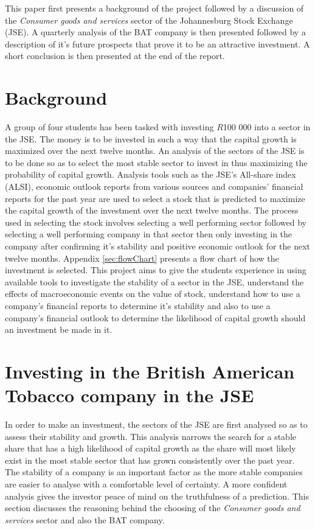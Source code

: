 \documentclass[letterpaper, 10 pt, conference]{ieeeconf}  %
\begin{document}
This paper first presents a background of the project followed by a discussion of the \textit{Consumer goods and services} sector of the Johannesburg Stock Exchange (JSE). A quarterly analysis of the BAT company is then presented followed by a description of it's future prospects that prove it to be an attractive investment. A short conclusion is then presented at the end of the report. 

\section{Background}

A group of four students has been tasked with investing $R$100 000 into a sector in the JSE. The money is to be invested in such a way that the capital growth is maximized over the next twelve months. An analysis of the sectors of the JSE is to be done so as to select the most stable sector to invest in thus maximizing the probability of capital growth. Analysis tools such as the JSE's All-share index (ALSI), economic outlook reports from various sources and companies' financial reports for the past year are used to select a stock that is predicted to maximize the capital growth of the investment over the next twelve months. The process used in selecting the stock involves selecting a well performing sector followed by selecting a well performing company in that sector then only investing in the company after confirming it's stability and positive economic outlook for the next twelve months. Appendix \ref{sec:flowChart} presents a flow chart of how the investment is selected. This project aims to give the students experience in using available tools to investigate the stability of a sector in the JSE, understand the effects of macroeconomic events on the value of stock, understand how to use a company's financial reports to determine it's stability and also to use a company's financial outlook to determine the likelihood of capital growth should an investment be made in it. 

\section{Investing in the British American Tobacco company in the JSE}

In order to make an investment, the sectors of the JSE are first analysed so as to assess their stability and growth. This analysis narrows the search for a stable share that has a high likelihood of capital growth as the share will most likely exist in the most stable sector that has grown consistently over the past year. The stability of a company is an important factor as the more stable companies are easier to analyse with a comfortable level of certainty. A more confident analysis gives the investor peace of mind on the truthfulness of a prediction. This section discusses the reasoning behind the choosing of the \textit{Consumer goods and services} sector and also the BAT company.
\end{document}
